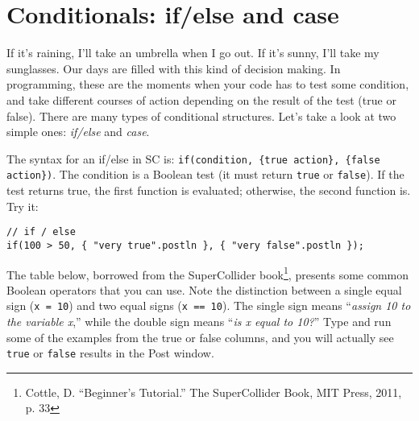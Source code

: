 \section{Conditionals: if/else and case}

If it's raining, I'll take an umbrella when I go out. If it's sunny, I'll take my sunglasses. Our days are filled with this kind of decision making. In programming, these are the moments when your code has to test some condition, and take different courses of action depending on the result of the test (true or false). There are many types of conditional structures. Let's take a look at two simple ones: \emph{if/else} and \emph{case}.

The syntax for an if/else in SC is: \texttt{if(condition, \{true action\}, \{false action\})}. The condition is a Boolean test (it must return \texttt{true} or \texttt{false}). If the test returns true, the first function is evaluated; otherwise, the second function is. Try it:

\begin{lstlisting}[style=SuperCollider-IDE, basicstyle=\scttfamily\footnotesize]
// if / else
if(100 > 50, { "very true".postln }, { "very false".postln });
\end{lstlisting}

The table below, borrowed from the SuperCollider book\footnote{Cottle, D. ``Beginner's Tutorial.'' The SuperCollider Book, MIT Press, 2011, p. 33}, presents some common Boolean operators that you can use. Note the distinction between a single equal sign (\texttt{x = 10}) and two equal signs (\texttt{x == 10}). The single sign means ``\textit{assign 10 to the variable x},'' while the double sign means ``\textit{is x equal to 10?}'' Type and run some of the examples from the true or false columns, and you will actually see \texttt{true} or \texttt{false} results in the Post window.
 

